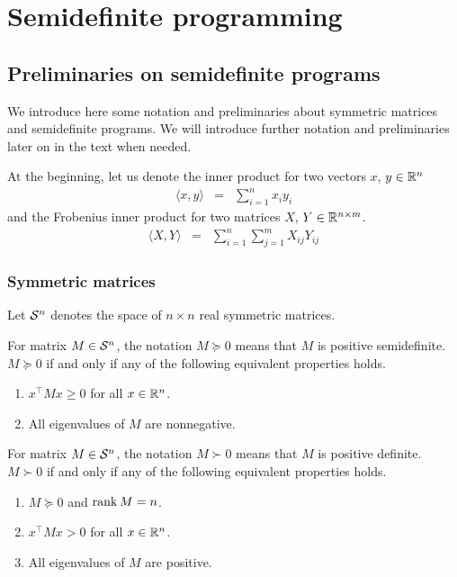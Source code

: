 \chapter{Semidefinite programming}


\section{Preliminaries on semidefinite programs}
We introduce here some notation and preliminaries about symmetric matrices and semidefinite programs.
We will introduce further notation and preliminaries later on in the text when needed.

At the beginning, let us denote the inner product for two vectors $x$, $y \in\mathbb{R}^n$
\begin{eqnarray}
  \langle x, y\rangle &=& \sum_{i=1}^n x_iy_i
\end{eqnarray}
and the Frobenius inner product for two matrices $X$, $Y\in\mathbb{R}^{n\times m}$.
\begin{eqnarray}
  \langle X, Y\rangle &=& \sum_{i=1}^n \sum_{j=1}^m X_{ij}Y_{ij}
\end{eqnarray}

\subsection{Symmetric matrices}
Let $\mathcal{S}^n$ denotes the space of $n\times n$ real symmetric matrices.

For matrix $M\in\mathcal{S}^n$, the notation $M \succeq 0$ means that $M$ is positive semidefinite.
$M \succeq 0$ if and only if any of the following equivalent properties holds.
\begin{enumerate}
  \item $x^\top Mx \geq 0$ for all $x \in \mathbb{R}^n$.
  \item All eigenvalues of $M$ are nonnegative.
\end{enumerate}

For matrix $M\in\mathcal{S}^n$, the notation $M \succ 0$ means that $M$ is positive definite.
$M \succ 0$ if and only if any of the following equivalent properties holds.
\begin{enumerate}
  \item $M \succeq 0$ and $\operatorname{rank} M = n$.
  \item $x^\top Mx > 0$ for all $x \in \mathbb{R}^n$.
  \item All eigenvalues of $M$ are positive.
\end{enumerate}


